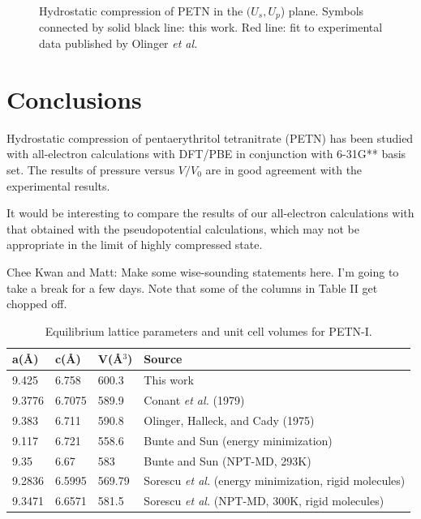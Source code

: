 \documentclass[prb,aps,nobibnotes,twocolumn,doublespace,twocolumngrid,superbib]{revtex4}
\begin{document}
\begin{figure}
\caption{Hydrostatic compression of PETN in the $(U_s,U_p$) plane.  
Symbols connected by solid black line: this work.  Red line: fit 
to experimental data published by Olinger {\it et al.}
}
\label{fig:us-up}
\end{figure}



\section{Conclusions}
\label{sec:conclusions}
Hydrostatic compression of pentaerythritol tetranitrate (PETN) has
been studied with all-electron calculations with DFT/PBE in
conjunction with 6-31G** basis set. The results of pressure versus 
$V/V_0$ are in good agreement with the experimental results.

It would be interesting to compare the results of 
our all-electron calculations with that
obtained with the pseudopotential
calculations, which may not be appropriate in 
the limit of highly compressed state.

Chee Kwan and Matt: Make some wise-sounding statements here.
I'm going to take a break for a few days.  Note that some of
the columns in Table II get chopped off.


\begin{table}[p]
\begin{center}
\begin{tabular}{llll}
\hline\hline
a(\AA) & c(\AA) & V(\AA$^3$) & Source \\
\hline
9.425  & 6.758  &  600.3  & This work \\
9.3776 & 6.7075 &  589.9  & Conant {\it {\it et al.}} (1979) \\
9.383  & 6.711  &  590.8  & Olinger, Halleck, and Cady (1975) \\
9.117  & 6.721  &  558.6  & Bunte and Sun (energy minimization) \\
9.35   & 6.67   &  583    & Bunte and Sun (NPT-MD, 293K) \\
9.2836 & 6.5995 &  569.79 & Sorescu {\it et al.}\/ (energy minimization, rigid molecules) \\
9.3471 & 6.6571 &  581.5  & Sorescu {\it et al.}\/ (NPT-MD, 300K, rigid molecules) \\
\hline\hline
\end{tabular}
\end{center}
\caption{Equilibrium lattice parameters and unit cell volumes for PETN-I.
}
\label{tab:table1}
\end{table}
\end{document}
